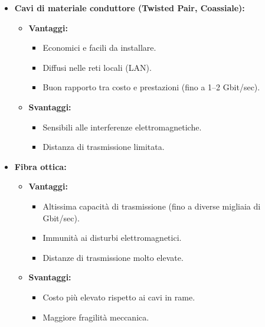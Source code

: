 \documentclass[a4paper,12pt]{report}
\begin{document}
\begin{itemize}

  \item \textbf{Cavi di materiale conduttore (Twisted Pair, Coassiale):}
  \begin{itemize}
    \item \textbf{Vantaggi:}
      \begin{itemize}
        \item Economici e facili da installare.
        \item Diffusi nelle reti locali (LAN).
        \item Buon rapporto tra costo e prestazioni (fino a 1--2 Gbit/sec).
      \end{itemize}
    \item \textbf{Svantaggi:}
      \begin{itemize}
        \item Sensibili alle interferenze elettromagnetiche.
        \item Distanza di trasmissione limitata.
      \end{itemize}
  \end{itemize}

  \item \textbf{Fibra ottica:}
  \begin{itemize}
    \item \textbf{Vantaggi:}
      \begin{itemize}
        \item Altissima capacità di trasmissione (fino a diverse migliaia di Gbit/sec).
        \item Immunità ai disturbi elettromagnetici.
        \item Distanze di trasmissione molto elevate.
      \end{itemize}
    \item \textbf{Svantaggi:}
      \begin{itemize}
        \item Costo più elevato rispetto ai cavi in rame.
        \item Maggiore fragilità meccanica.
      \end{itemize}
  \end{itemize}


\end{itemize}
\end{document}
